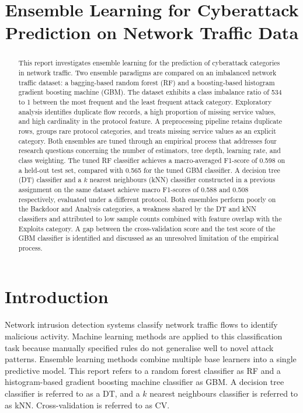 \documentclass[conference,10pt]{IEEEtran}
\begin{document}
\title{Ensemble Learning for Cyberattack Prediction on Network Traffic Data}

\author{
}

\maketitle

\begin{abstract}
This report investigates ensemble learning for the prediction of cyberattack categories in network traffic. Two ensemble paradigms are compared on an imbalanced network traffic dataset: a bagging-based random forest (RF) and a boosting-based histogram gradient boosting machine (GBM). The dataset exhibits a class imbalance ratio of 534 to 1 between the most frequent and the least frequent attack category. Exploratory analysis identifies duplicate flow records, a high proportion of missing service values, and high cardinality in the protocol feature. A preprocessing pipeline retains duplicate rows, groups rare protocol categories, and treats missing service values as an explicit category. Both ensembles are tuned through an empirical process that addresses four research questions concerning the number of estimators, tree depth, learning rate, and class weighting. The tuned RF classifier achieves a macro-averaged F1-score of 0.598 on a held-out test set, compared with 0.565 for the tuned GBM classifier. A decision tree (DT) classifier and a $k$ nearest neighbours (kNN) classifier constructed in a previous assignment on the same dataset achieve macro F1-scores of 0.588 and 0.508 respectively, evaluated under a different protocol. Both ensembles perform poorly on the Backdoor and Analysis categories, a weakness shared by the DT and kNN classifiers and attributed to low sample counts combined with feature overlap with the Exploits category. A gap between the cross-validation score and the test score of the GBM classifier is identified and discussed as an unresolved limitation of the empirical process.
\end{abstract}

\section{Introduction}
Network intrusion detection systems classify network traffic flows to identify malicious activity. Machine learning methods are applied to this classification task because manually specified rules do not generalise well to novel attack patterns. Ensemble learning methods combine multiple base learners into a single predictive model. This report refers to a random forest classifier as RF and a histogram-based gradient boosting machine classifier as GBM. A decision tree classifier is referred to as a DT, and a $k$ nearest neighbours classifier is referred to as kNN. Cross-validation is referred to as CV.
\end{document}
